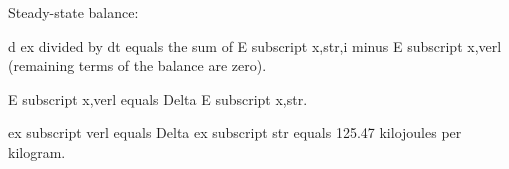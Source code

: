 Steady-state balance:  

d ex divided by dt equals the sum of E subscript x,str,i minus E subscript x,verl (remaining terms of the balance are zero).  

E subscript x,verl equals Delta E subscript x,str.  

ex subscript verl equals Delta ex subscript str equals 125.47 kilojoules per kilogram.